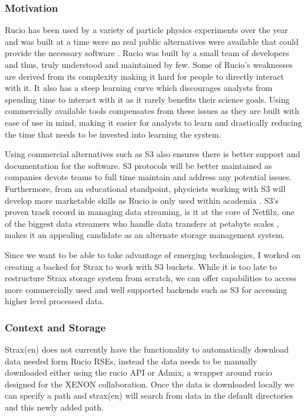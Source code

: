 \subsubsection{Motivation}

Rucio has been used by a variety of particle physics experiments over the year and was built at a time were no real public alternatives were available that could provide the necessary software \cite{Barisits_2019}. Rucio was built by a small team of developers and thus, truly understood and maintained by few. Some of Rucio's weaknesses are derived from its complexity making it hard for people to directly interact with it. It also has a steep learning curve which discourages analysts from spending time to interact with it as it rarely benefits their science goals. Using commercially available tools compensates from these issues as they are built with ease of use in mind, making it easier for analysts to learn 
and drastically reducing the time that needs to be invested into learning the system.

Using commercial alternatives such as S3 also ensures there is better support and documentation for the software. S3 protocols will be better maintained as companies devote teams to full time maintain and address any potential issues.
Furthermore, from an educational standpoint, physicists working with S3 will develop more marketable skills as Rucio is only used within academia \cite{mathur2018mastery}. S3's proven track record in managing data streaming, is it at the core of Netfilx, one of the biggest data streamers who handle data transfers at petabyte scales \cite{böttger2018openconnecteverywhereglimpse, netflix2016s3}, makes it an appealing candidate as an alternate storage management system. 

Since we want to be able to take advantage of emerging technologies, I worked on creating a backed for Strax to work with S3 buckets. While it is too late to restructure Strax storage system from scratch, we can offer capabilities to access more commercially used and well supported backends such as S3 for accessing higher level processed data.

\subsubsection*{Context and Storage} 

Strax(en) does not currently have the functionality to automatically download data needed form Rucio RSEs, instead the data needs to be manually downloaded either using the rucio API or Admix, a wrapper around rucio designed for the XENON collaboration. Once the data is downloaded locally we can specify a path and strax(en) will search from data in the default directories and this newly added path. 

